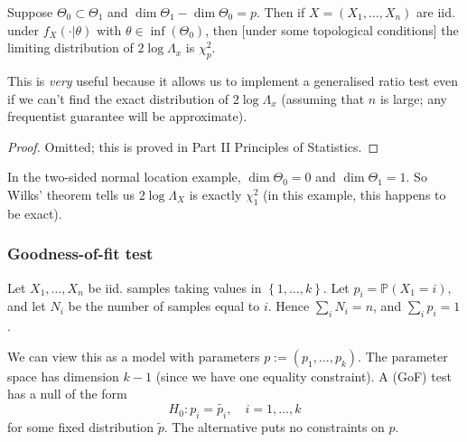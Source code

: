 \documentclass[egregdoesnotlikesansseriftitles,a4paper]{scrartcl}
\begin{document}
\begin{theorem}
     Suppose $\Theta_0 \subset \Theta_1 $ and $\operatorname{dim}\Theta_1 -\operatorname{dim}\Theta_0 =p$. Then if $X=(X_1 , \ldots, X_n)$ are iid. under $f_{X}(\cdot | \theta)$ with $\theta \in \inf (\Theta_0 )$, then [under some topological conditions] the limiting distribution of $2\log \Lambda_{x}$ is $\chi_{p}^2$.
     \begin{remark}
           This is \emph{very} useful because it allows us to implement a generalised ratio test even if we can't find the exact distribution of $2 \log \Lambda_{x}$ (assuming that $n$ is large; any frequentist guarantee will be approximate).
     \end{remark}
     \begin{proof}
           Omitted; this is proved in Part II Principles of Statistics.
     \end{proof}
\end{theorem}
\begin{example*}
      In the two-sided normal location example, $\operatorname{dim}\Theta_0 =0$ and $\operatorname{dim} \Theta_1 =1$. So Wilks' theorem tells us $2 \log \Lambda_{X}$ is exactly $\chi_1^2$ (in this example, this happens to be exact). 
\end{example*}
\subsubsection*{Goodness-of-fit test}
Let $X_1 ,\ldots,X_n$ be iid. samples taking values in $\left\{1, \ldots, k\right\}$. Let $p_{i}=\mathbb{P}(X_1 =i)$, and let $N_{i}$ be the number of samples equal to $i$. Hence $\sum_{i}^{}N_{i}=n$, and $\sum_{i}^{}p_{i}=1$. 

We can view this as a model with parameters $p:= (p_1 , \ldots,p_{k})$. The parameter space has dimension $k-1$ (since we have one equality constraint). A  (GoF) test has a null of the form \[
H_0 : p_{i}=\widetilde{p_{i}}, \quad i=1, \ldots, k
\] for some fixed distribution $\widetilde{p}$. The alternative puts no constraints on $p$.
\end{document}
